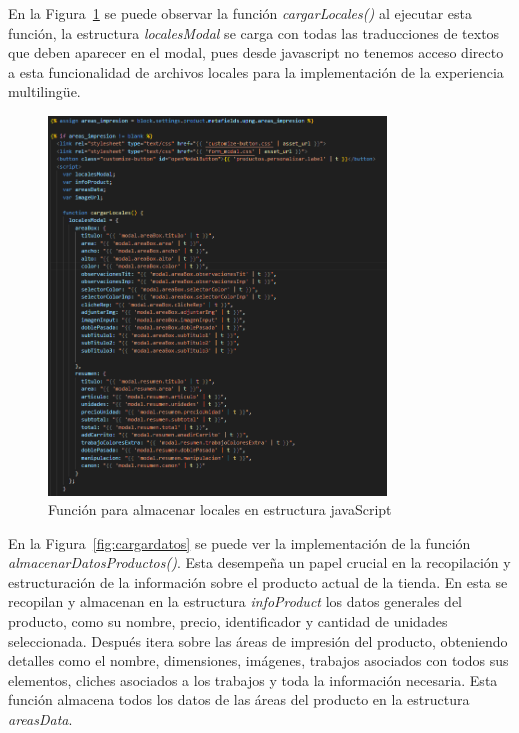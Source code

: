 \documentclass[12pt]{article}
\begin{document}
En la Figura~\ref{fig:cargarlocales} se puede observar la función \textit{cargarLocales()} al ejecutar esta función, la estructura \textit{localesModal} se carga con 
todas las traducciones de textos que deben aparecer en el modal, pues desde javascript no tenemos acceso directo a esta funcionalidad de archivos locales para la implementación 
de la experiencia multilingüe.

\begin{figure}[ht]
    \centering
    \includegraphics[width=0.8\textwidth]{imagenesUS3-section/funcioncargarLocales.png}
    \caption{\label{fig:cargarlocales} Función para almacenar locales en estructura javaScript}
    \vspace{\fill}
\end{figure}

En la Figura~\ref{fig:cargardatos} se puede ver la implementación de la función \textit{almacenarDatosProductos()}. Esta desempeña un papel crucial en 
la recopilación y estructuración de la información sobre el producto actual de la tienda. En esta se recopilan y almacenan en la estructura \textit{infoProduct} los datos generales del producto, como su nombre, precio, identificador y cantidad de
unidades seleccionada. Después itera sobre las áreas de impresión del producto, obteniendo detalles como el nombre, dimensiones, imágenes, trabajos asociados con todos sus elementos, cliches asociados a los trabajos y toda la información necesaria. Esta función
almacena todos los datos de las áreas del producto en la estructura \textit{areasData}.
\end{document}
